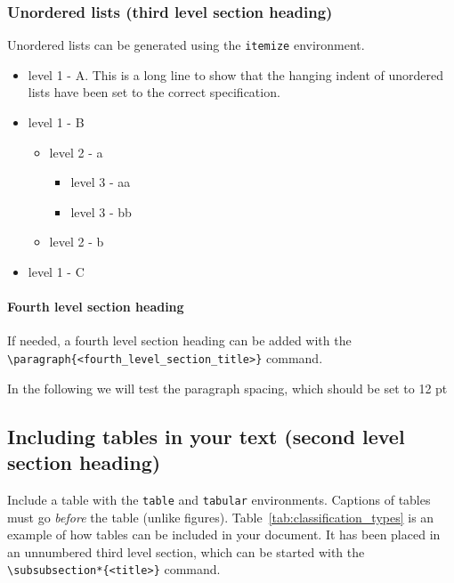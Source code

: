 \documentclass{nato-sto}
\begin{document}
\subsubsection{Unordered lists (third level section heading)}

Unordered lists can be generated using the \verb|itemize| environment.

\begin{itemize}
\item level 1 - A. This is a long line to show that the hanging indent of unordered lists have been set to the correct specification.
\item level 1 - B
	\begin{itemize}
		\item level 2 - a
		\begin{itemize}
			\item level 3 - aa
			\item level 3 - bb
		\end{itemize}
		\item level 2 - b
	\end{itemize}
\item level 1 - C
\end{itemize}

\paragraph{Fourth level section heading}

If needed, a fourth level section heading can be added with the \\
\verb|\paragraph{<fourth_level_section_title>}| command.

In the following we will test the paragraph spacing, which should be set to 12 pt

\lipsum[1]

\lipsum[2]

\lipsum[3]

\newpage

\subsection{Including tables in your text (second level section heading)}

Include a table with the \verb|table| and \verb|tabular| environments. Captions of tables must go \emph{before} the table (unlike figures). Table~\ref{tab:classification_types} is an example of how tables can be included in your document. It has been placed in an unnumbered third level section, which can be started with the \verb|\subsubsection*{<title>}| command.
\end{document}
